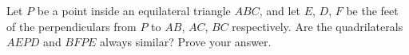 Let $P$ be a point inside an equilateral triangle $ABC$, and let $E$, $D$, $F$ be the feet of the perpendiculars from $P$ to $AB$, $AC$, $BC$ respectively. Are the quadrilaterals $AEPD$ and $BFPE$ always similar? Prove your answer.
